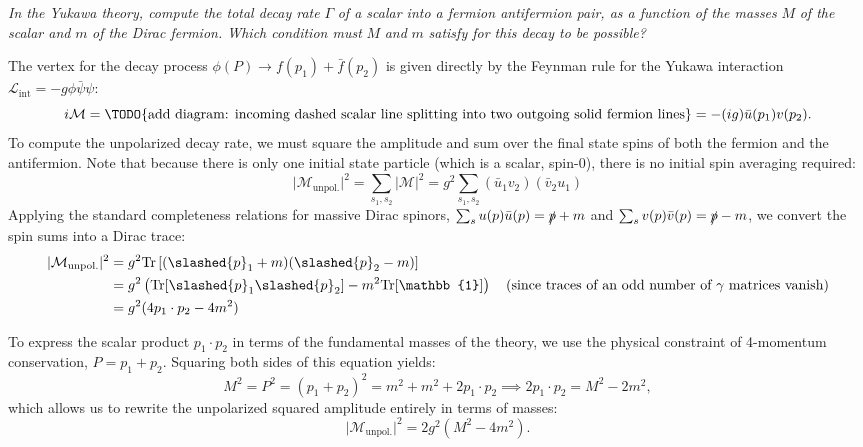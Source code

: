 \begin{center}
    \textit{In the Yukawa theory, compute the total decay rate} \( \Gamma \) \textit{of a scalar into a fermion antifermion pair, as a function of the masses} \(M\) \textit{of the scalar and} \(m\) \textit{of the Dirac fermion. Which condition must} \(M\) \textit{and} \(m\) \textit{satisfy for this decay to be possible?}
\end{center}

The vertex for the decay process \( \phi(P) \to f(p_1) + \bar{f}(p_2) \) is given directly by the Feynman rule for the Yukawa interaction \( \mathcal{L}_{\text{int}} = -g \phi \bar{\psi} \psi \):
\[
    i \mathcal{M} = \text{\TODO{add diagram: incoming dashed scalar line splitting into two outgoing solid fermion lines}} = -(ig) \bar{u}(p_1) v(p_2).
\]
To compute the unpolarized decay rate, we must square the amplitude and sum over the final state spins of both the fermion and the antifermion. Note that because there is only one initial state particle (which is a scalar, spin-0), there is no initial spin averaging required:
\[
    \vert \mathcal{M}_{\text{unpol.}} \vert^2 = \sum_{s_1, s_2} \vert \mathcal{M} \vert^2 = g^2 \sum_{s_1, s_2} (\bar{u}_1 v_2)(\bar{v}_2 u_1)
\]
Applying the standard completeness relations for massive Dirac spinors, \( \sum_{s} u(p)\bar{u}(p) = \slashed{p} + m \) and \( \sum_{s} v(p)\bar{v}(p) = \slashed{p} - m \), we convert the spin sums into a Dirac trace:
\[
    \begin{aligned}
        \vert \mathcal{M}_{\text{unpol.}} \vert^2 & = g^2 \text{Tr}\left[ (\slashed{p}_1 + m)(\slashed{p}_2 - m) \right]                                                                                                    \\
                                                  & = g^2 \left( \text{Tr}[\slashed{p}_1 \slashed{p}_2] - m^2 \text{Tr}[\mathbb{1}] \right) \quad (\text{since traces of an odd number of } \gamma \text{ matrices vanish}) \\
                                                  & = g^2 (4 p_1 \cdot p_2 - 4m^2)
    \end{aligned}
\]

To express the scalar product \( p_1 \cdot p_2 \) in terms of the fundamental masses of the theory, we use the physical constraint of 4-momentum conservation, \( P = p_1 + p_2 \). Squaring both sides of this equation yields:
\[
    M^2 = P^2 = (p_1 + p_2)^2 = m^2 + m^2 + 2 p_1 \cdot p_2 \implies 2 p_1 \cdot p_2 = M^2 - 2m^2,
\]
which allows us to rewrite the unpolarized squared amplitude entirely in terms of masses:
\[
    \vert \mathcal{M}_{\text{unpol.}} \vert^2 = 2 g^2 (M^2 - 4 m^2).
\]

